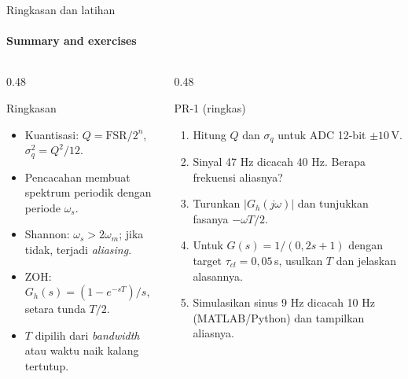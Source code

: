 \documentclass[aspectratio=169,10pt]{beamer}
\begin{document}
\begin{frame}{Ringkasan dan latihan}
	\framesubtitle{Summary and exercises}
	\begin{columns}[T]
		\begin{column}{0.48\textwidth}
			\begin{block}{Ringkasan}
				\small
				\begin{itemize}
					\item Kuantisasi: $Q=\text{FSR}/2^n$, $\sigma_q^2 = Q^2/12$.
					\item Pencacahan membuat spektrum periodik dengan periode $\omega_s$.
					\item Shannon: $\omega_s > 2\omega_m$; jika tidak, terjadi \textit{aliasing}.
					\item ZOH: $G_h(s) = (1-e^{-sT})/s$, setara tunda $T/2$.
					\item $T$ dipilih dari \textit{bandwidth} atau waktu naik kalang tertutup.
				\end{itemize}
			\end{block}
		\end{column}
		\begin{column}{0.48\textwidth}
			\begin{exampleblock}{PR-1 (ringkas)}
				\small
				\begin{enumerate}
					\item Hitung $Q$ dan $\sigma_q$ untuk ADC 12-bit $\pm 10$\,V.
					\item Sinyal 47 Hz dicacah 40 Hz. Berapa frekuensi aliasnya?
					\item Turunkan $|G_h(j\omega)|$ dan tunjukkan fasanya $-\omega T/2$.
					\item Untuk $G(s)=1/(0{,}2s+1)$ dengan target $\tau_{cl}=0{,}05$\,s, usulkan $T$ dan jelaskan alasannya.
					\item Simulasikan sinus 9 Hz dicacah 10 Hz (MATLAB/Python) dan tampilkan aliasnya.
				\end{enumerate}
			\end{exampleblock}
		\end{column}
	\end{columns}
\end{frame}
\end{document}
